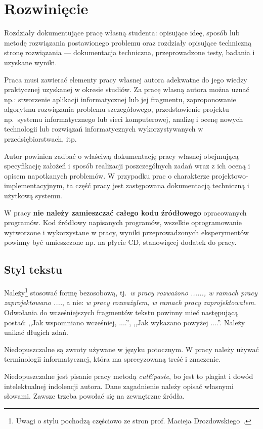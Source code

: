
\chapter{Rozwinięcie}

Rozdziały dokumentujące pracę własną studenta: opisujące ideę, sposób lub metodę
rozwiązania postawionego problemu oraz rozdziały opisujące techniczną stronę rozwiązania
--- dokumentacja techniczna, przeprowadzone testy, badania i uzyskane wyniki.

Praca musi zawierać elementy pracy własnej autora adekwatne do jego wiedzy praktycznej uzyskanej w
okresie studiów. Za pracę własną autora można uznać np.: stworzenie aplikacji informatycznej lub jej
fragmentu, zaproponowanie algorytmu rozwiązania problemu szczegółowego, przedstawienie projektu
np.~systemu informatycznego lub sieci komputerowej, analizę i ocenę nowych technologii lub rozwiązań
informatycznych wykorzystywanych w przedsiębiorstwach, itp.

Autor powinien zadbać o właściwą dokumentację pracy własnej obejmującą specyfikację założeń i
sposób realizacji poszczególnych zadań
wraz z ich oceną i opisem napotkanych problemów. W przypadku prac o charakterze
projektowo-implementacyjnym, ta część pracy jest zastępowana dokumentacją techniczną i użytkową systemu.

W pracy \textbf{nie należy zamieszczać całego kodu źródłowego} opracowanych programów. Kod źródłowy napisanych
programów, wszelkie oprogramowanie wytworzone i wykorzystane w pracy, wyniki przeprowadzonych
eksperymentów powinny być umieszczone np. na płycie CD, stanowiącej dodatek do pracy.

\section*{Styl tekstu}

Należy\footnote{Uwagi o stylu pochodzą częściowo ze stron prof. Macieja Drozdowskiego~\cite{Drozdowski2006}.}
stosować formę bezosobową, tj.~\emph{w pracy rozważono ......,
    w ramach pracy zaprojektowano ....}, a nie: \emph{w pracy rozważyłem, w ramach pracy zaprojektowałem}.
Odwołania do wcześniejszych fragmentów tekstu powinny mieć następującą postać: ,,Jak wspomniano wcześniej, ....'',
,,Jak wykazano powyżej ....''. Należy unikać długich zdań.

Niedopuszczalne są zwroty używane w języku potocznym. W pracy należy używać terminologii informatycznej, która ma
sprecyzowaną treść i znaczenie.

Niedopuszczalne jest pisanie pracy metodą \emph{cut\&paste}, bo jest to plagiat i dowód intelektualnej indolencji autora.
Dane zagadnienie należy opisać własnymi słowami. Zawsze trzeba powołać się na zewnętrzne źródła. 

